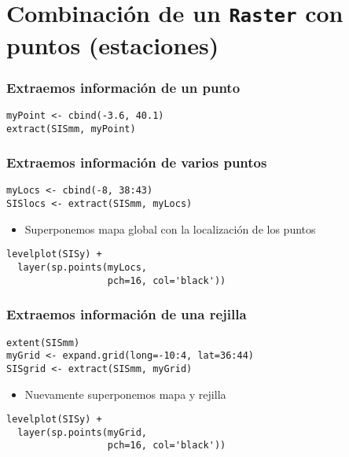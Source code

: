 \documentclass[xcolor={usenames,svgnames,dvipsnames}]{beamer}
\begin{document}
\section{Combinación de un \texttt{Raster} con puntos (estaciones)}
\label{sec-3}
\begin{frame}[fragile]
\frametitle{Extraemos información de un punto}
\label{sec-3-1}


\lstset{language=R}
\begin{lstlisting}
myPoint <- cbind(-3.6, 40.1)
extract(SISmm, myPoint)
\end{lstlisting}
\end{frame}
\begin{frame}[fragile]
\frametitle{Extraemos información de varios puntos}
\label{sec-3-2}


\lstset{language=R}
\begin{lstlisting}
myLocs <- cbind(-8, 38:43)
SISlocs <- extract(SISmm, myLocs)
\end{lstlisting}
\begin{itemize}
\item Superponemos mapa global con la localización de los puntos
\end{itemize}

\lstset{language=R}
\begin{lstlisting}
levelplot(SISy) +
  layer(sp.points(myLocs,
                  pch=16, col='black'))
\end{lstlisting}
\end{frame}
\begin{frame}[fragile]
\frametitle{Extraemos información de una rejilla}
\label{sec-3-3}


\lstset{language=R}
\begin{lstlisting}
extent(SISmm)
myGrid <- expand.grid(long=-10:4, lat=36:44)
SISgrid <- extract(SISmm, myGrid)
\end{lstlisting}
\begin{itemize}
\item Nuevamente superponemos mapa y rejilla
\end{itemize}

\lstset{language=R}
\begin{lstlisting}
levelplot(SISy) +
  layer(sp.points(myGrid,
                  pch=16, col='black'))
\end{lstlisting}
\end{frame}
\end{document}
